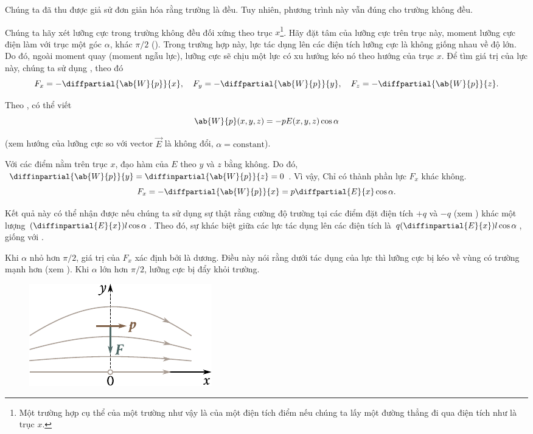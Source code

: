 Chúng ta đã thu được  giả sử đơn giản hóa rằng trường là đều. Tuy nhiên, phương trình này vẫn đúng cho trường không đều.

Chúng ta hãy xét lưỡng cực trong trường không đều đối xứng theo trục $x$\footnote{Một trường hợp cụ thể của một trường như vậy là của một điện tích điểm nếu chúng ta lấy một đường thẳng đi qua điện tích như là trục $x$.}. Hãy đặt tâm của lưỡng cực trên trục này, moment lưỡng cực điện làm với trục một góc $\alpha$, khác $\pi/2$ (). Trong trường hợp này, lực tác dụng lên các điện tích lưỡng cực là không giống nhau về độ lớn. Do đó, ngoài moment quay (moment ngẫu lực), lưỡng cực sẽ chịu một lực có xu hướng kéo nó theo hướng của trục $x$. Để tìm giá trị của lực này, chúng ta sử dụng , theo đó
\begin{equation*}
	F_x = -\diffpartial{\ab{W}{p}}{x},\quad F_y = -\diffpartial{\ab{W}{p}}{y},\quad F_z = -\diffpartial{\ab{W}{p}}{z}.
\end{equation*}

\noindent
Theo , có thể viết
\begin{equation*}
	\ab{W}{p}(x,y,z) = -p E(x,y,z)\cos\alpha
\end{equation*}

\noindent
(xem hướng của lưỡng cực so với vector $\vec{E}$ là không đổi, $\alpha=\text{constant}$).

Với các điểm nằm trên trục $x$, đạo hàm của $E$ theo $y$ và $z$ bằng không. Do đó, $\diffinpartial{\ab{W}{p}}{y}=\diffinpartial{\ab{W}{p}}{z}=0$. Vì vậy, Chỉ có thành phần lực $F_x$ khác không. 
\begin{equation}\label{eq:1_62}
	F_x = - \diffpartial{\ab{W}{p}}{x} = p \diffpartial{E}{x} \cos\alpha.
\end{equation}

\noindent
Kết quả này có thể nhận được nếu chúng ta sử dụng sự thật rằng cường độ trường tại các điểm đặt điện tích $+q$ và $-q$ (xem ) khác một lượng $(\diffinpartial{E}{x})l\cos\alpha$. Theo đó, sự khác biệt giữa các lực tác dụng lên các điện tích là $q(\diffinpartial{E}{x})l\cos\alpha$, giống với .

Khi $\alpha$ nhỏ hơn $\pi/2$, giá trị của $F_x$ xác định bởi  là dương. Điều này nói rằng dưới tác dụng của lực thì lưỡng cực bị kéo về vùng có trường mạnh hơn (xem ). Khi $\alpha$ lớn hơn $\pi/2$, lưỡng cực bị đẩy khỏi trường.

\begin{figure}[!htb]
	\begin{center}
		\includegraphics[scale=1]{figures/ch_01/fig_1_15.pdf}
		\caption[]{}
		\label{fig:1_15}
	\end{center}
	\vspace{-0.8cm}
\end{figure}

